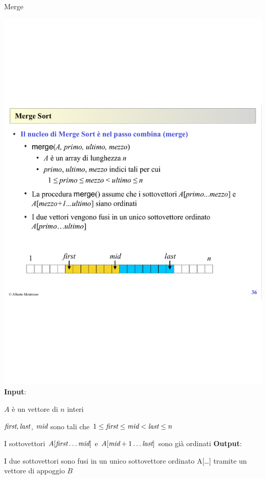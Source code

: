 \begin{frame}[shrink]{Merge}

\includegraphics[width=\textwidth]{merge.pdf}
\bigskip	
\textbf{Input}:
\BI
\item $A$ è un vettore di $n$ interi
\item $\textit{first}, \textit{last}$, $\textit{mid}$ sono tali che 
$1 \leq \textit{first} \leq \textit{mid} < \textit{last} \leq n$
\item I sottovettori $A[\textit{first} \ldots \textit{mid}]$ e $A[\textit{mid}+1 \ldots \textit{last}]$ sono già ordinati
\EI
\textbf{Output}:
\BI
\item I due sottovettori sono fusi in un unico sottovettore ordinato A[\Primo \ldots \Ultimo] tramite un vettore di appoggio $B$
\EI


\end{frame}

